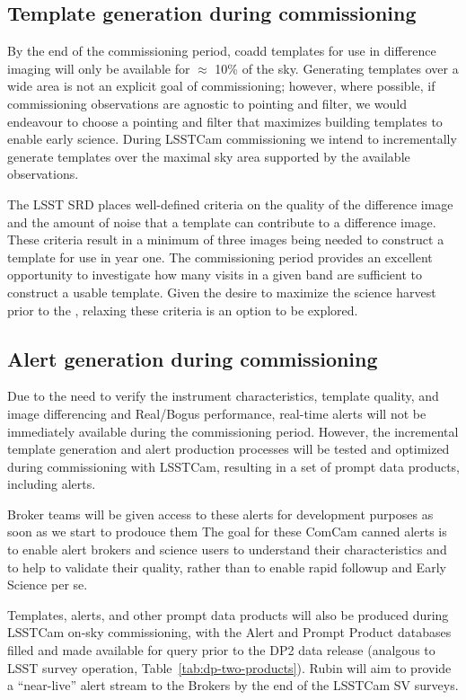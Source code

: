 \subsection{Template generation during commissioning}

By the end of the commissioning period, coadd templates for use in difference imaging will only be available for $\approx$ 10\% of the sky.
Generating templates over a wide area is not an explicit goal of commissioning;  however, where possible, if commissioning observations are agnostic to pointing and filter, we would endeavour to choose a pointing and filter that maximizes building templates to enable early science.
During LSSTCam commissioning we intend to incrementally generate templates over the maximal sky area supported by the available observations.

The LSST SRD places well-defined criteria on the quality of the difference image and the amount of noise that a template can contribute to a difference image.
These criteria result in a minimum of three images being needed to construct a template for use in year one.
The commissioning period provides an excellent opportunity to investigate how many visits in a given band are sufficient to construct a usable template.
Given the desire to maximize the science harvest prior to the \drone,  relaxing these criteria is an option to be explored.

\subsection{Alert generation during commissioning}

Due to the need to verify the instrument characteristics, template quality, and image differencing and Real/Bogus performance, real-time alerts will not be immediately available during the commissioning period.
However, the incremental template generation and alert production processes will be tested and optimized during commissioning with LSSTCam, resulting in a set of prompt data products, including alerts.

Broker teams will be given access to these alerts for development purposes as soon as we start to prodouce them
The goal for these ComCam canned alerts is to enable alert brokers and science users to understand their characteristics and to help to validate their quality, rather than to enable rapid followup and Early Science  per se.

Templates, alerts, and other prompt data products will also be produced during LSSTCam on-sky commissioning, with the Alert and Prompt Product databases filled and made available for query prior to the DP2 data release (analgous to LSST survey operation, Table~\ref{tab:dp-two-products}). 
Rubin will aim to provide a ``near-live'' alert stream to the Brokers by the end of the LSSTCam SV surveys.



